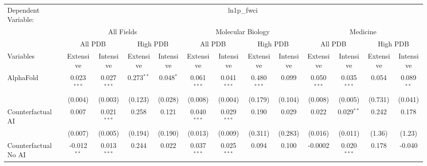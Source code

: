 \begingroup
\centering
\begin{tabular}{lcccccccccccc}
   \tabularnewline \midrule \midrule
   Dependent Variable: & \multicolumn{12}{c}{ln1p\_fwci}\\
 & \multicolumn{4}{c}{All Fields} & \multicolumn{4}{c}{Molecular Biology} & \multicolumn{4}{c}{Medicine} \\
\cmidrule(lr){2-5} \cmidrule(lr){6-9} \cmidrule(lr){10-13}
 & \multicolumn{2}{c}{All PDB} & \multicolumn{2}{c}{High PDB} & \multicolumn{2}{c}{All PDB} & \multicolumn{2}{c}{High PDB} & \multicolumn{2}{c}{All PDB} & \multicolumn{2}{c}{High PDB} \\
\cmidrule(lr){2-3} \cmidrule(lr){4-5} \cmidrule(lr){6-7} \cmidrule(lr){8-9} \cmidrule(lr){10-11} \cmidrule(lr){12-13}
Variables & \multicolumn{1}{c}{Extensive} & \multicolumn{1}{c}{Intensive} & \multicolumn{1}{c}{Extensive} & \multicolumn{1}{c}{Intensive} & \multicolumn{1}{c}{Extensive} & \multicolumn{1}{c}{Intensive} & \multicolumn{1}{c}{Extensive} & \multicolumn{1}{c}{Intensive} & \multicolumn{1}{c}{Extensive} & \multicolumn{1}{c}{Intensive} & \multicolumn{1}{c}{Extensive} & \multicolumn{1}{c}{Intensive} \\
\cmidrule(lr){1-1}\cmidrule(lr){2-2} \cmidrule(lr){3-3} \cmidrule(lr){4-4} \cmidrule(lr){5-5} \cmidrule(lr){6-6} \cmidrule(lr){7-7} \cmidrule(lr){8-8} \cmidrule(lr){9-9} \cmidrule(lr){10-10} \cmidrule(lr){11-11} \cmidrule(lr){12-12} \cmidrule(lr){13-13}
   AlphaFold                                & 0.023$^{***}$ & 0.027$^{***}$  & 0.273$^{**}$ & 0.048$^{*}$ & 0.061$^{***}$ & 0.041$^{***}$ & 0.480$^{***}$ & 0.099   & 0.050$^{***}$ & 0.035$^{***}$ & 0.054   & 0.089$^{**}$\\   
                                            & (0.004)       & (0.003)        & (0.123)      & (0.028)     & (0.008)       & (0.004)       & (0.179)       & (0.104) & (0.008)       & (0.005)       & (0.731) & (0.041)\\   
   Counterfactual AI                        & 0.007         & 0.021$^{***}$  & 0.258        & 0.121       & 0.040$^{***}$ & 0.029$^{***}$ & 0.190         & 0.029   & 0.022         & 0.029$^{**}$  & 0.242   & 0.178\\   
                                            & (0.007)       & (0.005)        & (0.194)      & (0.190)     & (0.013)       & (0.009)       & (0.311)       & (0.283) & (0.016)       & (0.011)       & (1.36)  & (1.23)\\   
   Counterfactual No AI                     & -0.012$^{**}$ & 0.013$^{***}$  & 0.244        & 0.022       & 0.037$^{***}$ & 0.025$^{***}$ & 0.094         & 0.100   & -0.0002       & 0.020$^{***}$ & 0.178   & -0.040\\   

\end{tabular}
